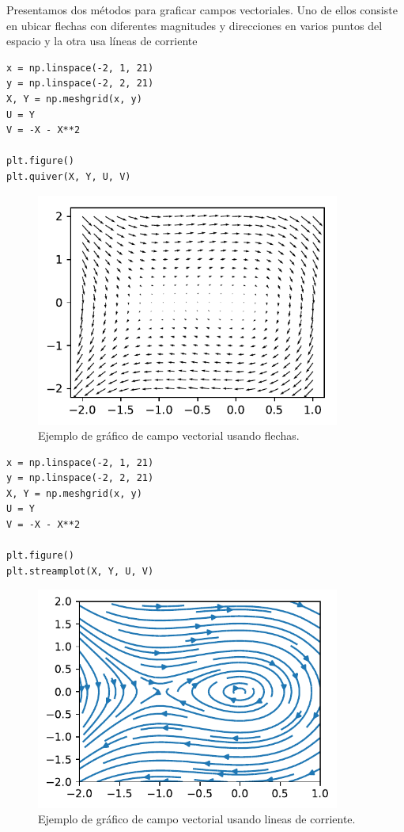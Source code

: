 Presentamos dos métodos para graficar campos vectoriales. Uno de ellos
consiste en ubicar flechas con diferentes magnitudes y direcciones en
varios puntos del espacio y la otra usa líneas de corriente

\begin{listing}[H]
\begin{verbatim}
x = np.linspace(-2, 1, 21)
y = np.linspace(-2, 2, 21)
X, Y = np.meshgrid(x, y)
U = Y
V = -X - X**2

plt.figure()
plt.quiver(X, Y, U, V)
\end{verbatim}
\end{listing}

\begin{figure}[H]
	\centering
	\includegraphics[width=10cm]{img/herramientas/grafico_flechas}
	\caption{Ejemplo de gráfico de campo vectorial usando flechas.}
	\label{fig:grafico_flechas}
\end{figure}

\begin{listing}[H]
\begin{verbatim}
x = np.linspace(-2, 1, 21)
y = np.linspace(-2, 2, 21)
X, Y = np.meshgrid(x, y)
U = Y
V = -X - X**2

plt.figure()
plt.streamplot(X, Y, U, V)
\end{verbatim}
\end{listing}

\begin{figure}[H]
	\centering
	\includegraphics[width=10cm]{img/herramientas/grafico_lineas_corriente}
	\caption{Ejemplo de gráfico de campo vectorial usando lineas de corriente.}
	\label{fig:grafico_lineas_corriente}
\end{figure}

